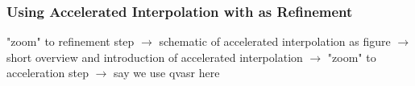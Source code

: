 \begin{frame}[t]
	\frametitle{Using Accelerated Interpolation with \qvasr as Refinement}
	"zoom" to refinement step $\rightarrow$ schematic of accelerated interpolation as figure $\rightarrow$ short overview and introduction of accelerated interpolation $\rightarrow$ "zoom" to acceleration step $\rightarrow$ say we use qvasr here
\end{frame}
